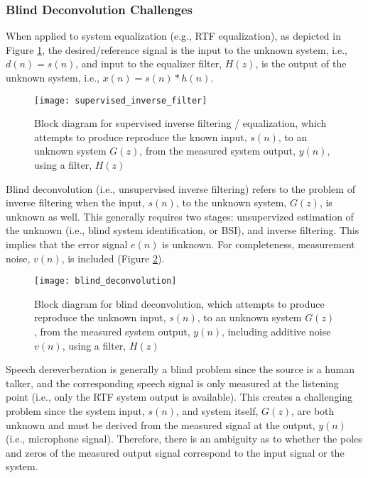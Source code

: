 \subsubsection{Blind Deconvolution Challenges}

When applied to system equalization (e.g., RTF equalization), as depicted in Figure \ref{fig:supervised_inverse_filter}, the desired/reference signal is the input to the unknown system, i.e., $d(n)=s(n)$, and input to the equalizer filter, $H(z)$, is the output of the unknown system, i.e., $x(n)=s(n)*h(n)$. 

\begin{figure}[H]
	\texttt{[image: supervised\_inverse\_filter]}
	\centering
	\caption[Block diagram for the supervised inverse filtering problem]{Block diagram for supervised inverse filtering / equalization, which attempts to produce reproduce the known input, $s(n)$, to an unknown system $G(z)$, from the measured system output, $y(n)$, using a filter, $H(z)$}
	\label{fig:supervised_inverse_filter}
\end{figure}

Blind deconvolution (i.e., unsupervised inverse filtering) refers to the problem of inverse filtering when the input, $s(n)$, to the unknown system, $G(z)$, is unknown as well. This generally requires two stages: unsupervized estimation of the unknown  (i.e., blind system identification, or BSI), and inverse filtering. This implies that the error signal $e(n)$ is unknown. For completeness, measurement noise, $v(n)$, is included (Figure \ref{fig:blind_deconvolution}).

\begin{figure}[H]
	\texttt{[image: blind\_deconvolution]}
	\centering
	\caption[Block diagram for the blind deconvolution problem]{Block diagram for blind deconvolution, which attempts to produce reproduce the unknown input, $s(n)$, to an unknown system $G(z)$, from the measured system output, $y(n)$, including additive noise $v(n)$, using a filter, $H(z)$}
	\label{fig:blind_deconvolution}
\end{figure}

Speech dereverberation is generally a blind problem since the source is a human talker, and the corresponding speech signal is only measured at the listening point (i.e., only the RTF system output is available). This creates a challenging problem since the system input, $s(n)$, and system itself, $G(z)$, are both unknown and must be derived from the measured signal at the output, $y(n)$ (i.e., microphone signal). Therefore, there is an ambiguity as to whether the poles and zeros of the measured output signal correspond to the input signal or the system.

